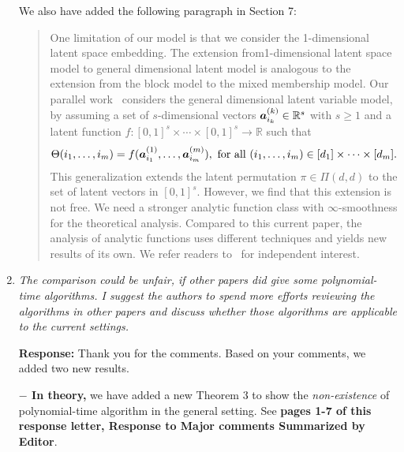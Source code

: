 \documentclass[11pt]{article}
\theoremstyle{plain}
\theoremstyle{definition}
\begin{document}
\begin{enumerate}[wide, labelwidth=!, labelindent=0pt]
    We also have added the following paragraph in Section 7:
    \begin{quote}
   { \color{blue}
One limitation of our model is that we consider the 1-dimensional latent space embedding. %
The extension from1-dimensional latent space model to general dimensional latent model is analogous to the extension from the block model to the mixed membership model. Our parallel work~\citep{lee2023statistical} considers the general dimensional latent variable model, by assuming  a set of $s$-dimensional vectors $\bm{a}^{(k)}_{i_k}\in\mathbb{R}^s$ with $s\geq 1$ and a latent function $f\colon[0,1]^{s}\times\cdots\times[0,1]^{s}\rightarrow \mathbb{R}$ such that
    \begin{align}\label{eq:LVM2}
    \Theta(i_1,\ldots,i_m) = f(\bm{a}^{(1)}_{i_1},\ldots,\bm{a}^{(m)}_{i_m}), \text{ for all } (i_1,\ldots,i_m)\in[d_1]\times\cdots\times [d_m].
\end{align}
This generalization extends the latent permutation $\pi\in\Pi(d,d)$ to the set of latent vectors in $[0,1]^s$. However, we find that this extension is not free. We need a stronger analytic function class with $\infty$-smoothness for the theoretical analysis. Compared to this current paper, the analysis of analytic functions uses different techniques and yields new results of its own. We refer readers to~\cite{lee2023statistical} for independent interest. }
  \end{quote}
    

    
    
        
    \item \textit{The comparison could be unfair, if other papers did give some polynomial-time algorithms. I suggest the authors to spend more efforts reviewing the algorithms in other papers and discuss whether those algorithms are applicable to the current settings.}
    
    \textbf{Response:} Thank you for the comments. 
    Based on your comments, we added two new results. 
    
 {\bf $-$ In theory,} we have added a new Theorem 3 to show the \emph{non-existence} of polynomial-time algorithm in the general setting. See {\bf pages 1-7 of this response letter, Response to Major comments Summarized by Editor}.  
  

\end{enumerate}
\end{document}
